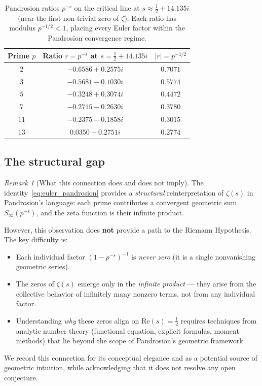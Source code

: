 \documentclass[10pt,a4paper,oneside]{book}
\theoremstyle{definition}
\theoremstyle{remark}
\newtheorem{remark}[theorem]{Remark}
\begin{document}
\begin{table}[h]
\centering
\begin{tabular}{ccc}
\toprule
Prime $p$ & Ratio $r = p^{-s}$ at $s = \tfrac{1}{2} + 14.135i$ & $|r| = p^{-1/2}$ \\
\midrule
$2$ & $-0.6586 + 0.2575i$ & $0.7071$ \\
$3$ & $-0.5681 - 0.1030i$ & $0.5774$ \\
$5$ & $-0.3248 + 0.3074i$ & $0.4472$ \\
$7$ & $-0.2715 - 0.2630i$ & $0.3780$ \\
$11$ & $-0.2375 - 0.1858i$ & $0.3015$ \\
$13$ & $0.0350 + 0.2751i$ & $0.2774$ \\
\bottomrule
\end{tabular}
\caption{Pandrosion ratios $p^{-s}$ on the critical line at $s \approx \tfrac{1}{2} + 14.135i$ (near the first non-trivial zero of $\zeta$).  Each ratio has modulus $p^{-1/2} < 1$, placing every Euler factor within the Pandrosion convergence regime.}
\label{tab:critical_ratios}
\end{table}

\subsection{The structural gap}

\begin{remark}[What this connection does and does not imply]
\label{rem:honest}
The identity~\eqref{eq:euler_pandrosion} provides a \emph{structural} reinterpretation of $\zeta(s)$ in Pandrosion's language: each prime contributes a convergent geometric sum $S_\infty(p^{-s})$, and the zeta function is their infinite product.

However, this observation does \textbf{not} provide a path to the Riemann Hypothesis.  The key difficulty is:
\begin{itemize}
  \item Each individual factor $(1 - p^{-s})^{-1}$ is \emph{never zero} (it is a single nonvanishing geometric series).
  \item The zeros of $\zeta(s)$ emerge only in the \emph{infinite product} --- they arise from the collective behavior of infinitely many nonzero terms, not from any individual factor.
  \item Understanding \emph{why} these zeros align on $\mathrm{Re}(s) = \tfrac{1}{2}$ requires techniques from analytic number theory (functional equation, explicit formulas, moment methods) that lie beyond the scope of Pandrosion's geometric framework.
\end{itemize}
We record this connection for its conceptual elegance and as a potential source of geometric intuition, while acknowledging that it does not resolve any open conjecture.
\end{remark}
\end{document}
